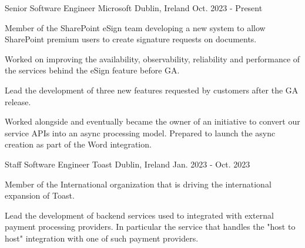 

\begin{cventries}

  \cventry
    {Senior Software Engineer} %
    {Microsoft} %
    {Dublin, Ireland} %
    {Oct. 2023 - Present} %
    {}
    {
      \begin{cvitems} %
        \item {Member of the SharePoint eSign team developing a new system to allow SharePoint premium users to create signature requests on documents.}
        \item {Worked on improving the availability, observability, reliability and performance of the services behind the eSign feature before GA.}
        \item {Lead the development of three new features requested by customers after the GA release.}
        \item {Worked alongside and eventually became the owner of an initiative to convert our service APIs into an async processing model. Prepared to launch the async creation as part of the Word integration.}
      \end{cvitems}
    }

  \cventry
    {Staff Software Engineer} %
    {Toast} %
    {Dublin, Ireland} %
    {Jan. 2023 - Oct. 2023} %
    {}
    {
      \begin{cvitems} %
        \item {Member of the International organization that is driving the international expansion of Toast.}
        \item {Lead the development of backend services used to integrated with external payment processing providers. In particular the service that handles the "host to host" integration with one of such payment providers.}
      \end{cvitems}
    }


\end{cventries}
